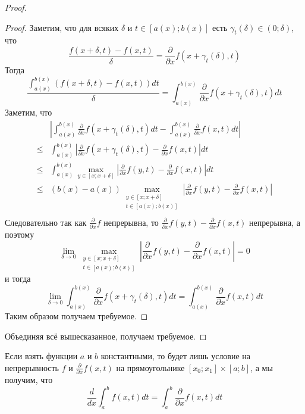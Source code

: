 \documentclass[12pt,a4paper]{article}
\begin{document}
\begin{proof}
        \begin{proof}
            Заметим, что для всяких $\delta$ и $t \in [a(x); b(x)]$ есть $\gamma_t(\delta) \in (0; \delta)$, что
            \[\frac{f(x + \delta, t) - f(x, t)}{\delta} = \frac{\partial}{\partial x} f(x +  \gamma_t(\delta), t)\]
            Тогда
            \[
                \frac{\int_{a(x)}^{b(x)} (f(x + \delta, t) - f(x, t)) dt}{\delta}
                = \int_{a(x)}^{b(x)} \frac{\partial}{\partial x} f(x + \gamma_t(\delta), t) dt
            \]
            Заметим, что
            \begin{align*}
                &\left|\int_{a(x)}^{b(x)} \frac{\partial}{\partial x} f(x + \gamma_t(\delta), t) dt - \int_{a(x)}^{b(x)} \frac{\partial}{\partial x} f(x, t) dt\right|\\
                \leqslant& \int_{a(x)}^{b(x)} \left|\frac{\partial}{\partial x} f(x + \gamma_t(\delta), t) - \frac{\partial}{\partial x} f(x, t)\right| dt\\
                \leqslant& \int_{a(x)}^{b(x)} \max_{y \in [x; x + \delta]} \left|\frac{\partial}{\partial x} f(y, t) - \frac{\partial}{\partial x} f(x, t)\right| dt\\
                \leqslant& (b(x) - a(x)) \max_{\substack{y \in [x; x + \delta]\\ t \in [a(x); b(x)]}} \left|\frac{\partial}{\partial x} f(y, t) - \frac{\partial}{\partial x} f(x, t)\right|\\
            \end{align*}
            Следовательно так как $\frac{\partial}{\partial x} f$ непрерывна, то $\frac{\partial}{\partial x} f(y, t) - \frac{\partial}{\partial x} f(x, t)$ непрерывна, а поэтому
            \[\lim_{\delta \to 0} \max_{\substack{y \in [x; x + \delta]\\ t \in [a(x); b(x)]}} \left|\frac{\partial}{\partial x} f(y, t) - \frac{\partial}{\partial x} f(x, t)\right| = 0\]
            и тогда
            \[
                \lim_{\delta \to 0} \int_{a(x)}^{b(x)} \frac{\partial}{\partial x} f(x + \gamma_t(\delta), t) dt
                = \int_{a(x)}^{b(x)} \frac{\partial}{\partial x} f(x, t) dt
            \]
            Таким образом получаем требуемое.
        \end{proof}

        Объединяя всё вышесказанное, получаем требуемое.
    \end{proof}

    \begin{corollary}
        Если взять функции $a$ и $b$ константными, то будет лишь условие на непрерывность $f$ и $\frac{\partial}{\partial x} f(x, t)$ на прямоугольнике $[x_0; x_1] \times [a; b]$, а мы получим, что
        \[\frac{d}{dx} \int_a^b f(x, t) dt = \int_a^b \frac{\partial}{\partial x} f(x, t) dt\]
    \end{corollary}
\end{document}
